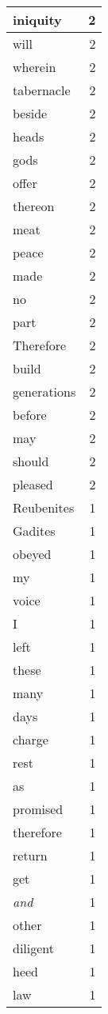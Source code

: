 \begin{center}
\begin{longtable}{l|r}
iniquity & 2\\ \hline 
will & 2\\ \hline 
wherein & 2\\ \hline 
tabernacle & 2\\ \hline 
beside & 2\\ \hline 
heads & 2\\ \hline 
gods & 2\\ \hline 
offer & 2\\ \hline 
thereon & 2\\ \hline 
meat & 2\\ \hline 
peace & 2\\ \hline 
made & 2\\ \hline 
no & 2\\ \hline 
part & 2\\ \hline 
Therefore & 2\\ \hline 
build & 2\\ \hline 
generations & 2\\ \hline 
before & 2\\ \hline 
may & 2\\ \hline 
should & 2\\ \hline 
pleased & 2\\ \hline 
Reubenites & 1\\ \hline 
Gadites & 1\\ \hline 
obeyed & 1\\ \hline 
my & 1\\ \hline 
voice & 1\\ \hline 
I & 1\\ \hline 
left & 1\\ \hline 
these & 1\\ \hline 
many & 1\\ \hline 
days & 1\\ \hline 
charge & 1\\ \hline 
rest & 1\\ \hline 
as & 1\\ \hline 
promised & 1\\ \hline 
therefore & 1\\ \hline 
return & 1\\ \hline 
get & 1\\ \hline 
\emph{and} & 1\\ \hline 
other & 1\\ \hline 
diligent & 1\\ \hline 
heed & 1\\ \hline 
law & 1\\ \hline 

\end{longtable}
\end{center}
